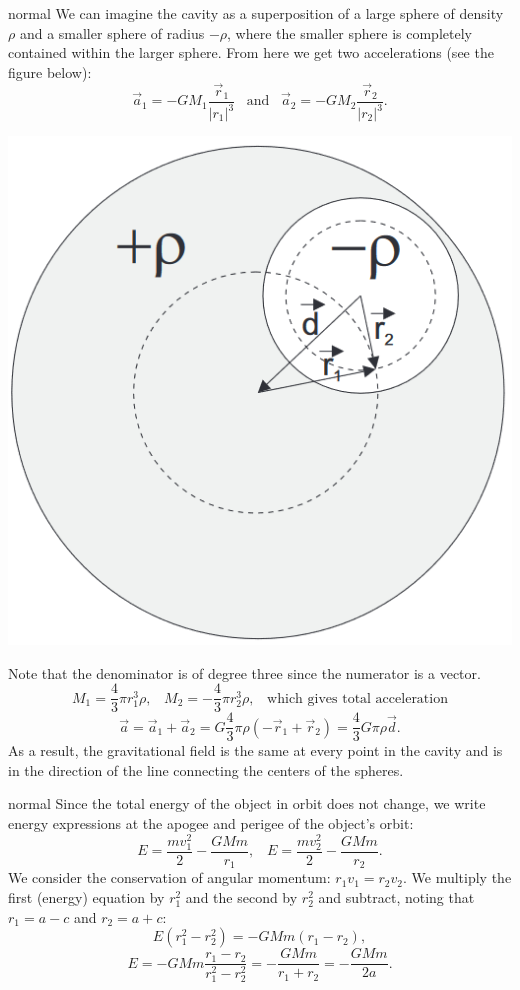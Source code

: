 \documentclass[11pt]{article}
\begin{document}
\begin{answer}{normal} %
We can imagine the cavity as a superposition of a large sphere of density $\rho$ and a smaller sphere of radius $-\rho$, where the smaller sphere is completely contained within the larger sphere. From here we get two accelerations (see the figure below):
$$\vec{a}_1=-GM_1\dfrac{\vec{r}_1}{|r_1|^3}\;\;\;\text{and}\;\;\;\vec{a}_2=-GM_2\dfrac{\vec{r}_2}{|r_2|^3}.$$
\begin{center}
    \includegraphics[width=0.4\linewidth]{Images/CM6.png}
\end{center}
Note that the denominator is of degree three since the numerator is a vector.
$$M_1=\dfrac{4}{3}\pi r_1^3\rho,\;\;\;M_2=-\dfrac{4}{3}\pi r_2^3\rho,\;\;\;\text{which gives total acceleration}$$
$$\vec{a}=\vec{a}_1+\vec{a}_2=G\dfrac{4}{3}\pi\rho\left(-\vec{r}_1+\vec{r}_2\right)=\dfrac{4}{3}G\pi\rho\vec{d}.$$
As a result, the gravitational field is the same at every point in the cavity and is in the direction of the line connecting the centers of the spheres.
\end{answer}

\begin{answer}{normal} %
Since the total energy of the object in orbit does not change, we write energy expressions at the apogee and perigee of the object's orbit:
$$E=\dfrac{mv_1^2}{2}-\dfrac{GMm}{r_1},\;\;\;E=\dfrac{mv_2^2}{2}-\dfrac{GMm}{r_2}.$$
We consider the conservation of angular momentum: $r_1v_1=r_2v_2$. We multiply the first (energy) equation by $r_1^2$ and the second by $r_2^2$ and subtract, noting that $r_1=a-c$ and $r_2=a+c$:
$$E\left(r_1^2-r_2^2\right)=-GMm(r_1-r_2),$$
$$E=-GMm\dfrac{r_1-r_2}{r_1^2-r_2^2}=-\dfrac{GMm}{r_1+r_2}=-\dfrac{GMm}{2a}.$$
\end{answer}
\end{document}
